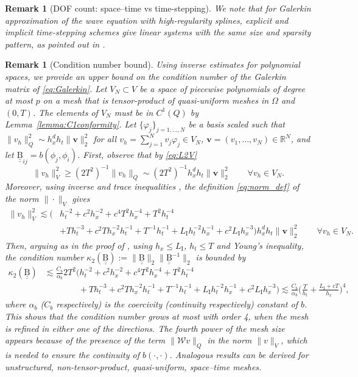 \documentclass[a4paper]{article}
\theoremstyle{plain}
\newtheorem{remark}[theorem]{Remark}
\theoremstyle{definition}
\newcommand{\vect}[1]{\bm{#1}}
\newcommand{\mat}[1]{\underline{\underline{\mathrm{#1}}}}
\newcommand{\LI}{L_{\mathrm I}}
\begin{document}
\begin{remark}[DOF count: space--time vs time-stepping]
We note that for Galerkin approximation of the wave equation with high-regularity splines, explicit and implicit time-stepping schemes give linear systems with the same size and sparsity pattern, as pointed out in \cite[sect.~4]{PavarinoZampieri2021}.
\end{remark}

\begin{remark}[Condition number bound]
	\label{remark:condNumber}
Using inverse estimates for polynomial spaces, we provide an upper bound on the condition number of the Galerkin matrix of \eqref{eq:Galerkin}.
	Let $V_N \subset V$ be a space of piecewise polynomials of degree at most $p$ on a mesh that is tensor-product of quasi-uniform meshes in $\Omega$ and $(0,T)$.
	The elements of $V_N$ must be in $C^1(Q)$ by Lemma~\ref{lemma:C1conformity}.
	Let $\{\varphi_j\}_{j=1,\ldots,N}$ be a basis scaled such that $\|v_h\|_{Q}^2 \sim h_x^{d}h_t \|\vect v\|_2^2$ for all $v_h=\sum_{j=1}^N v_j\varphi_j \in V_N$, $\vect v=(v_1,\ldots,v_N)\in\mathbb R^N$, and let  $\mat B_{ij} = b(\phi_j, \phi_i)$. First, observe that by \eqref{eq:L2V}
	\begin{equation*}
		\|v_h\|_V^2 \geq (2T^2)^{-1} \|v_h\|_Q \sim (2T^2)^{-1} h_x^dh_t \|\vect v\|_2^2\qquad \forall v_h\in V_N.
	\end{equation*}
	Moreover, using inverse and trace inequalities \cite[Lemma~4.5.3, Thm.~1.6.6]{BrennerScottRidgway2008},
	the definition \eqref{eq:norm_def} of the norm $\|\cdot\|_V$ gives
	\begin{align*} \|v_h\|_V^2 \lesssim \big( &
			h_t^{-2} + c^2 h_x^{-2} + c^4 T^2 h_x^{-4} + T^2 h_t^{-4} \\ & + T h_t^{-3} + c^2 T h_x^{-2}h_t^{-1} +T^{-1}h_t^{-1}
			+ \LI h_t^{-2}h_x^{-1} + c^2 \LI h_x^{-3} \big) h_x^dh_t \|\vect v\|_2^2
			\qquad \forall v_h\in V_N.
	\end{align*}
	Then, arguing as in the proof of \cite[Prop.~5.4]{Moiola2014}, using $h_x\le \LI$, $h_t\le T$ and Young's inequality, the condition number $\kappa_2(\mat B) := \|\mat B\|_2 \|\mat B^{-1}\|_2$ is bounded by
	\begin{align*}
		\kappa_2(\mat B) & \lesssim \frac{C_b}{\alpha_b} {2T^2} \Big(
			h_t^{-2} + c^2 h_x^{-2} + c^4 T^2 h_x^{-4} + T^2 h_t^{-4} \\ &\qquad \qquad
			+ T h_t^{-3} + c^2 T h_x^{-2}h_t^{-1} +T^{-1}h_t^{-1}
			+ \LI h_t^{-2}h_x^{-1} + c^2 \LI h_x^{-3} \Big) \lesssim \frac{C_b}{\alpha_b}
\bigg(\frac T{h_t}+\frac{\LI+cT}{h_x}\bigg)^4,
	\end{align*}
where $\alpha_b$ ($C_b$ respectively) is the coercivity (continuity respectively) constant of $b$.
	This shows that the condition number grows at most with order 4, when the mesh is refined in either one of the directions.
	The fourth power of the mesh size appears because of the presence of the term $\|\mathcal W v\|_Q$ in the norm $\|v\|_V$, which is needed to ensure the continuity of $b(\cdot,\cdot)$.
	Analogous results can be derived for unstructured, non-tensor-product, quasi-uniform, space--time meshes.
\end{remark}
\end{document}
